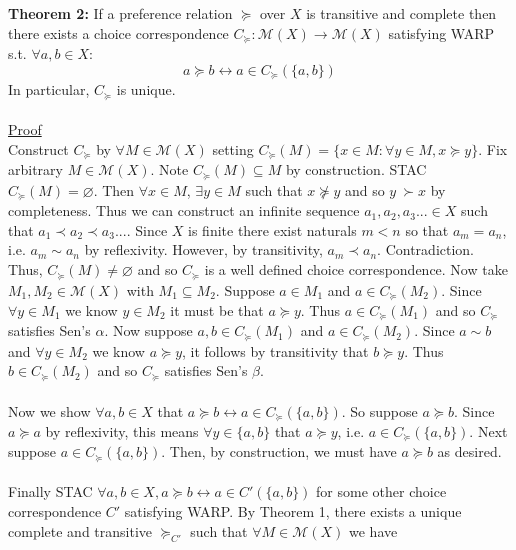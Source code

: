 \documentclass[11pt]{article}
\theoremstyle{definition}
\theoremstyle{plain}
\begin{document}
\\
\\
\textbf{Theorem 2:} If a preference relation $\succeq$ over $X$ is transitive and complete then there exists a choice correspondence $C_{\succeq}: \mathcal{M}(X) \to \mathcal{M}(X)$ satisfying WARP s.t. $\forall a,b \in X$:
$$a \succeq b \leftrightarrow a \in C_{\succeq}(\{a,b\})$$
In particular, $C_{\succeq}$ is unique.  
\\
\\
\underline{Proof}
\\
Construct $C_{\succeq}$ by $\forall M \in \mathcal{M}(X)$ setting $C_{\succeq}(M)=\{x \in M : \forall y \in M, x \succeq y\}.$ Fix arbitrary $M \in \mathcal{M}(X)$. Note $C_{\succeq}(M) \subseteq M$ by construction. STAC $C_{\succeq}(M)=\varnothing$. Then $\forall x \in M$, $\exists y \in M$ such that $x \not \succeq y$ and so $y \ \succ x$ by completeness. Thus we can construct an infinite sequence $a_1,a_2,a_3... \in X$ such that $a_1 \prec a_2 \prec a_3...$. Since $X$ is finite there exist naturals $m<n$ so that $a_m=a_n$, i.e. $a_m \sim a_n$ by reflexivity. However, by transitivity, $a_m \prec a_n$. Contradiction. Thus, $C_{\succeq}(M) \neq \varnothing$ and so $C_{\succeq}$ is a well defined choice correspondence. Now take $M_1,M_2 \in \mathcal{M}(X)$ with $M_1 \subseteq M_2$. Suppose $a \in M_1$ and $a \in C_{\succeq}(M_2)$.  Since $\forall y \in M_1$ we know $y \in M_2$ it must be that $a \succeq y$. Thus $a \in C_{\succeq}(M_1)$ and so $C_{\succeq}$ satisfies Sen's $\alpha$.  Now suppose $a,b \in C_{\succeq}(M_1)$ and $a \in C_{\succeq}(M_2)$. Since $a \sim b$ and $\forall y \in M_2$ we know $a \succeq y$, it follows by transitivity that $b \succeq y$. Thus $b \in C_{\succeq}(M_2)$ and so $C_{\succeq}$ satisfies Sen's $\beta$. 
\\
\\
Now we show $\forall a,b \in X$ that $a \succeq b \leftrightarrow a \in C_{\succeq}(\{a,b\})$. So suppose $a \succeq b$. Since $a \succeq a$ by reflexivity, this means $\forall y \in \{a,b\}$ that $a \succeq y$, i.e. $a \in C_{\succeq}(\{a,b\})$. Next suppose $a \in C_{\succeq}(\{a,b\})$. Then, by construction, we must have $a \succeq b$ as desired. 
\\
\\
\noindent Finally STAC $\forall a,b \in X, a \succeq b \leftrightarrow a \in C'(\{a,b\})$ for some other choice correspondence $C'$ satisfying WARP. By Theorem 1, there exists a unique complete and transitive $\succeq_{C'}$ such that $\forall M \in \mathcal{M}(X)$ we have
\end{document}
